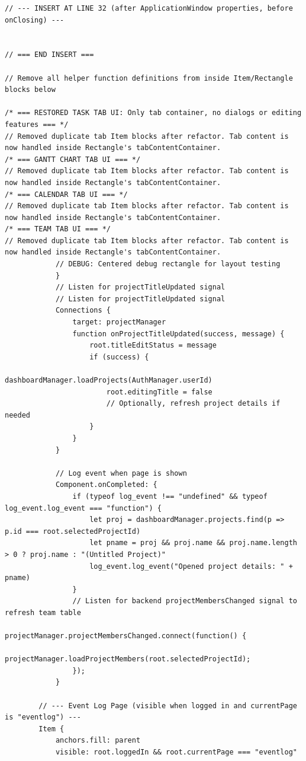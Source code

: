 \documentclass{report}
\begin{document}
\begin{lstlisting}[style=qmlstyle]
// --- INSERT AT LINE 32 (after ApplicationWindow properties, before onClosing) ---


// === END INSERT ===

// Remove all helper function definitions from inside Item/Rectangle blocks below

/* === RESTORED TASK TAB UI: Only tab container, no dialogs or editing features === */
// Removed duplicate tab Item blocks after refactor. Tab content is now handled inside Rectangle's tabContentContainer.
/* === GANTT CHART TAB UI === */
// Removed duplicate tab Item blocks after refactor. Tab content is now handled inside Rectangle's tabContentContainer.
/* === CALENDAR TAB UI === */
// Removed duplicate tab Item blocks after refactor. Tab content is now handled inside Rectangle's tabContentContainer.
/* === TEAM TAB UI === */
// Removed duplicate tab Item blocks after refactor. Tab content is now handled inside Rectangle's tabContentContainer.
            // DEBUG: Centered debug rectangle for layout testing
            }
            // Listen for projectTitleUpdated signal
            // Listen for projectTitleUpdated signal
            Connections {
                target: projectManager
                function onProjectTitleUpdated(success, message) {
                    root.titleEditStatus = message
                    if (success) {
                        dashboardManager.loadProjects(AuthManager.userId)
                        root.editingTitle = false
                        // Optionally, refresh project details if needed
                    }
                }
            }

            // Log event when page is shown
            Component.onCompleted: {
                if (typeof log_event !== "undefined" && typeof log_event.log_event === "function") {
                    let proj = dashboardManager.projects.find(p => p.id === root.selectedProjectId)
                    let pname = proj && proj.name && proj.name.length > 0 ? proj.name : "(Untitled Project)"
                    log_event.log_event("Opened project details: " + pname)
                }
                // Listen for backend projectMembersChanged signal to refresh team table
                projectManager.projectMembersChanged.connect(function() {
                    projectManager.loadProjectMembers(root.selectedProjectId);
                });
            }

        // --- Event Log Page (visible when logged in and currentPage is "eventlog") ---
        Item {
            anchors.fill: parent
            visible: root.loggedIn && root.currentPage === "eventlog"


\end{lstlisting}
\end{document}
